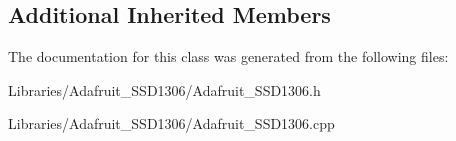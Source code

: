 \subsection*{Additional Inherited Members}


The documentation for this class was generated from the following files\+:\begin{DoxyCompactItemize}
\item 
Libraries/\+Adafruit\+\_\+\+S\+S\+D1306/Adafruit\+\_\+\+S\+S\+D1306.\+h\item 
Libraries/\+Adafruit\+\_\+\+S\+S\+D1306/Adafruit\+\_\+\+S\+S\+D1306.\+cpp\end{DoxyCompactItemize}
